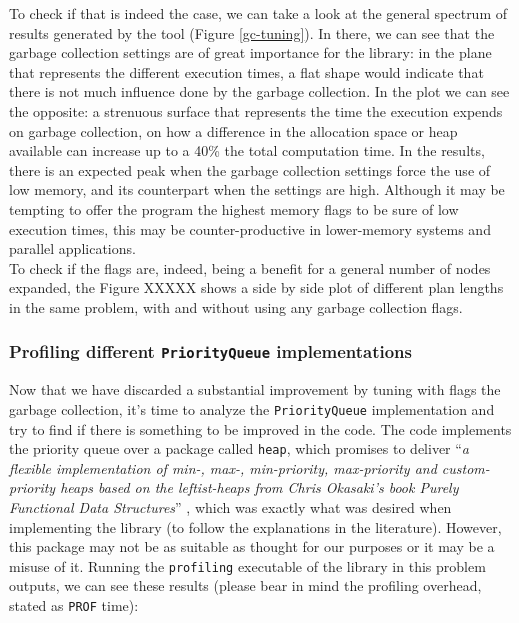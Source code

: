 To check if that is indeed the case, we can take a look at the general spectrum
of results generated by the tool (Figure \ref{gc-tuning}). In there, we can see
that the garbage collection settings are of great importance for the library:
in the plane that represents the different execution times, a flat shape would
indicate that there is not much influence done by the garbage collection. In
the plot we can see the opposite: a strenuous surface that represents the time
the execution expends on garbage collection, on how a difference in the
allocation space or heap available can increase up to a 40\% the total
computation time. In the results, there is an expected peak when the garbage
collection settings force the use of low memory, and its counterpart when the
settings are high. Although it may be tempting to offer the program the highest
memory flags to be sure of low execution times, this may be counter-productive
in lower-memory systems and parallel applications.\\

To check if the flags are, indeed, being a benefit for a general number of
nodes expanded, the Figure XXXXX shows a side by side plot of different plan
lengths in the same problem, with and without using any garbage collection
flags.


\subsubsection{Profiling different \texttt{PriorityQueue} implementations}


Now that we have discarded a substantial improvement by tuning with flags the
garbage collection, it's time to analyze the \texttt{PriorityQueue}
implementation and try to find if there is something to be improved in the
code. The code implements the priority queue over a package called
\texttt{heap}, which promises to deliver ``\textit{a flexible implementation of
  min-, max-, min-priority, max-priority and custom-priority heaps based on the
  leftist-heaps from Chris Okasaki's book Purely Functional Data Structures}''
\cite{okasaki-1999-purely}, which was exactly what was desired when
implementing the library (to follow the explanations in the literature).
However, this package may not be as suitable as thought for our purposes or it
may be a misuse of it. Running the \texttt{profiling} executable of the library
in this problem outputs, we can see these results (please bear in mind the
profiling overhead, stated as \texttt{PROF} time):\\

